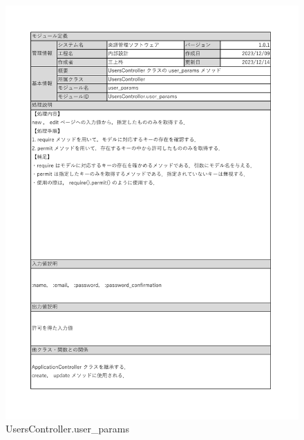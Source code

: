 \begin{figure}
    \centering
    \includegraphics[scale=0.5]{img/Method/user_params.pdf}
    \caption{UsersController.user\_params}
\end{figure}
\clearpage

